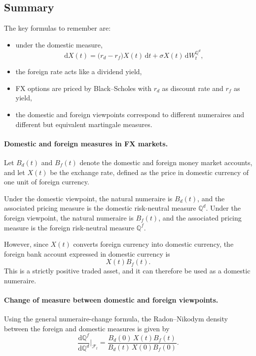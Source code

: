 \documentclass[11pt]{article}
\newcommand{\F}{\mathcal{F}}
\newcommand{\Qbb}{\mathbb{Q}}
\theoremstyle{definition}
\theoremstyle{plain}
\begin{document}
\subsection{Summary}

The key formulas to remember are:
\begin{itemize}[leftmargin=1.4em]
\item under the domestic measure,
\[
\mathrm{d}X(t)=\big(r_d-r_f\big)X(t)\,\mathrm{d}t+\sigma X(t)\,\mathrm{d}W_t^{\Qbb^d},
\]
\item the foreign rate acts like a dividend yield,
\item FX options are priced by Black--Scholes with \(r_d\) as discount
rate and \(r_f\) as yield,
\item the domestic and foreign viewpoints correspond to different
numeraires and different but equivalent martingale measures.
\end{itemize}

\paragraph{Domestic and foreign measures in FX markets.}

Let \(B_d(t)\) and \(B_f(t)\) denote the domestic and foreign money
market accounts, and let \(X(t)\) be the exchange rate, defined as the
price in domestic currency of one unit of foreign currency.

Under the domestic viewpoint, the natural numeraire is \(B_d(t)\), and
the associated pricing measure is the domestic risk-neutral measure
\(\Qbb^d\).
Under the foreign viewpoint, the natural numeraire is \(B_f(t)\), and
the associated pricing measure is the foreign risk-neutral measure
\(\Qbb^f\).

However, since \(X(t)\) converts foreign currency into domestic
currency, the foreign bank account expressed in domestic currency is
\[
X(t)B_f(t).
\]
This is a strictly positive traded asset, and it can therefore be used
as a domestic numeraire.

\paragraph{Change of measure between domestic and foreign viewpoints.}

Using the general numeraire-change formula, the Radon--Nikodym density
between the foreign and domestic measures is given by
\[
\frac{\mathrm{d}\Qbb^f}{\mathrm{d}\Qbb^d}\Big|_{\F_t}
=
\frac{B_d(0)\,X(t)B_f(t)}{B_d(t)\,X(0)B_f(0)}.
\]
\end{document}
